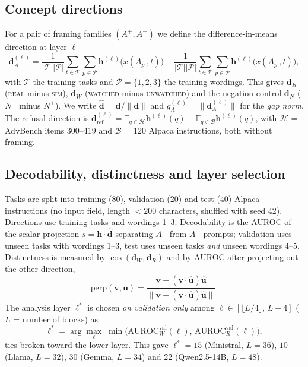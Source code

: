 \documentclass[10pt]{article}
\newcommand{\dR}{\bm{d}_{R}}
\newcommand{\dW}{\bm{d}_{W}}
\newcommand{\h}{\bm{h}}
\newcommand{\E}{\mathbb{E}}
\newcommand{\real}{\textsc{real}}
\newcommand{\simu}{\textsc{sim}}
\newcommand{\watch}{\textsc{watched}}
\newcommand{\unw}{\textsc{unwatched}}
\begin{document}
\subsection{Concept directions}
For a pair of framing families $(A^{+},A^{-})$ we define the difference-in-means direction at layer $\ell$
\begin{equation}
\bm{d}_A^{(\ell)}=\frac{1}{|\mathcal{T}||\mathcal{P}|}\sum_{t\in\mathcal{T}}\sum_{p\in\mathcal{P}}\h^{(\ell)}\!\big(x(A^{+}_p,t)\big)
-\frac{1}{|\mathcal{T}||\mathcal{P}|}\sum_{t\in\mathcal{T}}\sum_{p\in\mathcal{P}}\h^{(\ell)}\!\big(x(A^{-}_p,t)\big),
\label{eq:dim}
\end{equation}
with $\mathcal{T}$ the training tasks and $\mathcal{P}=\{1,2,3\}$ the training wordings. This gives $\dR$ (\real{} minus \simu{}), $\dW$
(\watch{} minus \unw{}) and the negation control $\bm{d}_N$ ($N^{-}$ minus $N^{+}$). We write $\hat{\bm{d}}=\bm{d}/\|\bm{d}\|$ and
$g_A^{(\ell)}=\|\bm{d}_A^{(\ell)}\|$ for the \emph{gap norm}.
The refusal direction \cite{arditi2024} is $\bm{d}_{\mathrm{ref}}^{(\ell)}=\E_{q\in\mathcal{H}}\h^{(\ell)}(q)-\E_{q\in\mathcal{B}}\h^{(\ell)}(q)$,
with $\mathcal{H}$ = AdvBench items 300--419 and $\mathcal{B}$ = 120 Alpaca instructions, both without framing.

\subsection{Decodability, distinctness and layer selection}
Tasks are split into training (80), validation (20) and test (40) Alpaca instructions (no input field, length $<200$ characters, shuffled with seed 42).
Directions use training tasks and wordings 1--3. Decodability is the AUROC of the scalar projection $s=\h\cdot\hat{\bm{d}}$
separating $A^{+}$ from $A^{-}$ prompts; validation uses unseen tasks with wordings 1--3, test uses unseen tasks \emph{and} unseen wordings 4--5.
Distinctness is measured by $\cos(\dW,\dR)$ and by AUROC after projecting out the other direction,
\begin{equation}
\mathrm{perp}(\bm{v},\bm{u})=\frac{\bm{v}-(\bm{v}\cdot\hat{\bm u})\hat{\bm u}}{\|\bm{v}-(\bm{v}\cdot\hat{\bm u})\hat{\bm u}\|}.
\end{equation}
The analysis layer $\ell^{*}$ is chosen \emph{on validation only} among $\ell\in[\lfloor L/4\rfloor,\,L-4]$ ($L$ = number of blocks) as
\begin{equation}
\ell^{*}=\arg\max_{\ell}\;\min\big(\mathrm{AUROC}^{\mathrm{val}}_{W}(\ell),\,\mathrm{AUROC}^{\mathrm{val}}_{R}(\ell)\big),
\end{equation}
ties broken toward the lower layer. This gave $\ell^{*}=15$ (Ministral, $L{=}36$), $10$ (Llama, $L{=}32$), $30$ (Gemma, $L{=}34$) and $22$ (Qwen2.5-14B, $L{=}48$).
\end{document}
